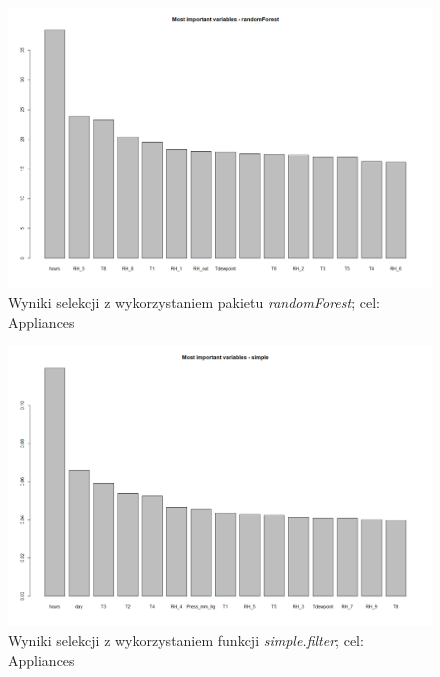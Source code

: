 \documentclass[a4paper,11pt,twoside]{mwrep}  %
\begin{document}
 \begin{figure}[!h]
    \centering \includegraphics[scale=0.4]{../rf_app.png}
    \caption{Wyniki selekcji z wykorzystaniem pakietu \textit{randomForest}; cel: Appliances}
    \label{fig:rf_app}
\end{figure}

 \begin{figure}[!h]
    \centering \includegraphics[scale=0.4]{../simple_app.png}
    \caption{Wyniki selekcji z wykorzystaniem funkcji \textit{simple.filter}; cel: Appliances}
    \label{fig:simple_app}
\end{figure}
\end{document}
